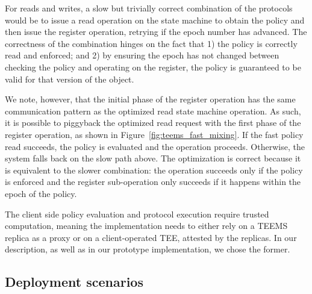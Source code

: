 For reads and writes, a slow but trivially correct combination of
the protocols would be to issue a read operation on the state
machine to obtain the policy and then issue the register
operation, retrying if the epoch number has advanced.
The correctness of the combination hinges on the fact that 1) the
policy is correctly read and enforced; and 2) by ensuring the epoch
has not changed between checking the policy and operating on the
register, the policy is guaranteed to be valid for that version of the
object.

%


We note, however, that the initial phase of the register operation has
the same communication pattern as the optimized read state machine
operation. As such, it is possible to piggyback the optimized read
request with the first phase of the register operation, as shown in
Figure~\ref{fig:teems_fast_mixing}. If the fast policy read succeeds,
the policy is evaluated and the operation proceeds.  Otherwise, the
system falls back on the slow path above. The optimization is correct
because it is equivalent to the slower combination: the operation
succeeds only if the policy is enforced and the register sub-operation
only succeeds if it happens within the epoch of the policy.

The client side policy evaluation and protocol execution require
trusted computation, meaning the implementation needs to either
rely on a \ac{TEEMS} replica as a proxy or on a client-operated \ac{TEE},
attested by the replicas. In our description, as well as in our
prototype implementation, we chose the former.

\subsection{Deployment scenarios}

